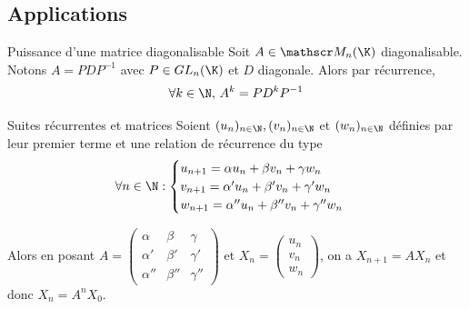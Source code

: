 \subsection{Applications }

\begin{proposition}{Puissance d'une matrice diagonalisable}{}
    Soit $A \in \mathscr M_n(\K)$ diagonalisable. Notons $A = PDP^{-1}$ avec $P \in GL_n(\K)$ et $D$ diagonale.
    Alors par récurrence, $$\forall k \in \N, \, A^k = P D^k P^{-1}$$
\end{proposition}

\begin{proposition}{Suites récurrentes et matrices}{}
    Soient $(u_n)_{n \in \N}, (v_n)_{n \in \N}$ et $(w_n)_{n \in \N}$ définies par leur 
    premier terme et une relation de récurrence du type 
    $$\forall n \in \N : \begin{cases}
        u_{n + 1} = \alpha u_n + \beta v_n + \gamma w_n \\
        v_{n + 1} = \alpha' u_n + \beta' v_n + \gamma' w_n \\
        w_{n + 1} = \alpha'' u_n + \beta'' v_n + \gamma'' w_n
    \end{cases}$$

    Alors en posant $A = \begin{pmatrix}
        \alpha & \beta & \gamma \\
        \alpha' & \beta' & \gamma' \\
        \alpha'' & \beta'' & \gamma''
    \end{pmatrix}$ et $X_n = \begin{pmatrix}
        u_n \\
        v_n \\
        w_n
    \end{pmatrix}$, on a $X_{n + 1} = A X_n$ et donc $X_n = A^n X_0$.
\end{proposition}


